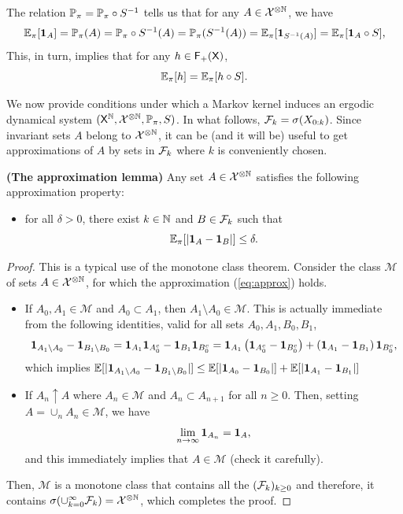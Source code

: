 \documentclass[english,graybox,envcountchap,envcountsame,sectrefs,shortlabels]{svmono}
\theoremstyle{style}
\begin{document}
The relation $\mathbb{P}_{\pi}=\mathbb{P}_{\pi}\circ S^{-1}$ tells us that for
any $A\in\mathcal{X}^{\otimes\mathbb{N}}$, we have
\[
\mathbb{E}_{\pi}[\mathbf{1}_{A}]=\mathbb{P}_{\pi}(A)=\mathbb{P}_{\pi}\circ S^{-1}(A)=\mathbb{P}_{\pi}(S^{-1}(A))=\mathbb{E}_{\pi}[\mathbf{1}_{S^{-1}(A)}]=\mathbb{E}_{\pi}[\mathbf{1}_{A}\circ S],
\]
This, in turn, implies that for any $h\in\mathsf{F_{+}}(\mathsf{X})$,
\[
\mathbb{E}_{\pi}[h]=\mathbb{E}_{\pi}[h\circ S].
\]

We now provide conditions under which a Markov kernel induces an ergodic
dynamical system $(\mathsf{X}^{\mathbb{N}},\mathcal{X}^{\otimes\mathbb{N}},\mathbb{P}_{\pi},S)$.
In what follows, $\mathcal{F}_{k}=\sigma(X_{0:k})$. Since invariant sets
$A$ belong to $\mathcal{X}^{\otimes\mathbb{N}}$, it can be (and it will be)
useful to get approximations of $A$ by sets in $\mathcal{F}_{k}$ where
$k$ is conveniently chosen.
\begin{lemma}
\textbf{\label{lem:approx}(The approximation lemma)} Any set $A\in\mathcal{X}^{\otimes\mathbb{N}}$
satisfies the following approximation property:
\begin{itemize}
\item for all $\delta>0$, there exist $k\in\mathbb{N}$ and $B\in\mathcal{F}_{k}$
such that
\begin{equation}
\mathbb{E}_{\pi}[|\mathbf{1}_{A}-\mathbf{1}_{B}|]\leq\delta.\label{eq:approx}
\end{equation}
\end{itemize}
\end{lemma}
\begin{proof}
This is a typical use of the monotone class theorem. Consider the
class $\mathcal{M}$ of sets $A\in\mathcal{X}^{\otimes\mathbb{N}}$, for which
the approximation (\ref{eq:approx}) holds.
\begin{itemize}
\item If $A_{0},A_{1} \in \mathcal{M}$ and $A_{0}\subset A_{1}$, then $A_{1}\setminus A_{0}\in\mathcal{M}$.
This is actually immediate from the following identities, valid for
all sets $A_{0},A_{1},B_{0},B_{1}$,
$$
\mathbf{1}_{A_{1}\setminus A_{0}}-\mathbf{1}_{B_{1}\setminus B_{0}} =\mathbf{1}_{A_{1}}\mathbf{1}_{A_{0}^c}-\mathbf{1}_{B_{1}}\mathbf{1}_{B_{0}^c}=\mathbf{1}_{A_{1}}\left(\mathbf{1}_{A_{0}^c} -\mathbf{1}_{B_0^c}\right)+\left(\mathbf{1}_{A_1}-\mathbf{1}_{B_1}\right)\mathbf{1}_{B_0^c},  
$$
which implies $\mathbb{E}[|\mathbf{1}_{A_{1}\setminus A_{0}}-\mathbf{1}_{B_{1}\setminus B_{0}}|]\leq\mathbb{E}[|\mathbf{1}_{A_{0}}-\mathbf{1}_{B_{0}}|] +\mathbb{E}[|\mathbf{1}_{A_{1}}-\mathbf{1}_{B_{1}}|]$
\item If $A_{n}\uparrow A$ where $A_{n}\in\mathcal{M}$ and $A_{n}\subset A_{n+1}$
for all $n\geq0$. Then, setting $A=\cup_{n}A_{n}\in\mathcal{M}$,
we have
\[
\lim_{n\to\infty}\mathbf{1}_{A_{n}}=\mathbf{1}_{A},
\]
and this immediately implies that $A\in\mathcal{M}$ (check it carefully).
\end{itemize}
Then, $\mathcal{M}$ is a monotone class that contains all the $(\mathcal{F}_{k})_{k\geq0}$
and therefore, it contains $\sigma(\cup_{k=0}^{\infty}\mathcal{F}_{k})=\mathcal{X}^{\otimes\mathbb{N}}$, which completes the proof.
\end{proof}
\end{document}
